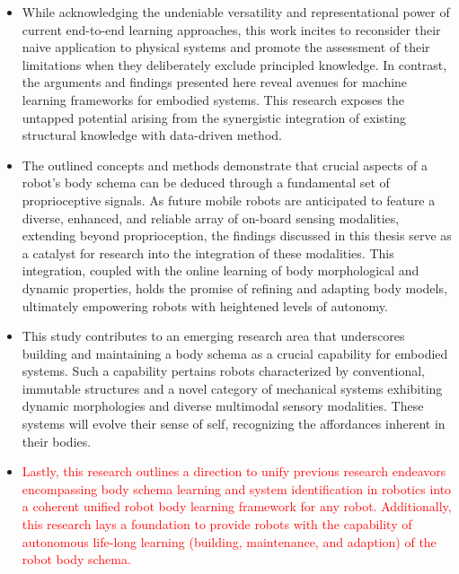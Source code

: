 \documentclass[12pt, a4paper]{article}
\newcommand{\redtext}[1]{\textcolor{red}{#1}}
\begin{document}
\begin{itemize}
	
	\item While acknowledging the undeniable versatility and representational power of current end-to-end learning approaches, this work incites to reconsider their naive application to physical systems and promote the assessment of their limitations when they deliberately exclude principled knowledge. In contrast, the arguments and findings presented here reveal avenues for machine learning frameworks for embodied systems. This research exposes the untapped potential arising from the synergistic integration of existing structural knowledge with data-driven method.
	
	\item The outlined concepts and methods demonstrate that crucial aspects of a robot's body schema can be deduced through a fundamental set of proprioceptive signals. As future mobile robots are anticipated to feature a diverse, enhanced, and reliable array of on-board sensing modalities, extending beyond proprioception, the findings discussed in this thesis serve as a catalyst for research into the integration of these modalities. This integration, coupled with the online learning of body morphological and dynamic properties, holds the promise of refining and adapting body models, ultimately empowering robots with heightened levels of autonomy.
	
	\item This study contributes to an emerging research area that underscores building and maintaining a body schema as a crucial capability for embodied systems. Such a capability pertains robots characterized by conventional, immutable structures and a novel category of mechanical systems exhibiting dynamic morphologies and diverse multimodal sensory modalities. These systems will evolve their sense of self, recognizing the affordances inherent in their bodies.
	
	\item \redtext{Lastly, this research outlines a direction to unify previous research endeavors encompassing body schema learning and system identification in robotics into a coherent unified robot body learning framework for any robot. Additionally, this research lays a foundation to provide robots with the capability of autonomous life-long learning (building, maintenance, and adaption) of the robot body schema.}
	

\end{itemize}
\end{document}
